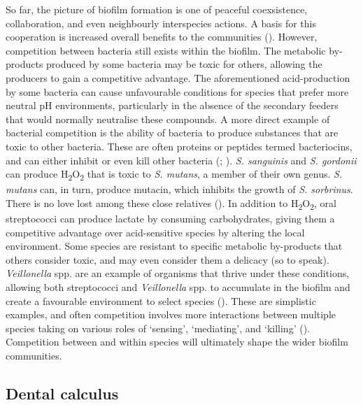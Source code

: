 \documentclass[
  b5paper,
]{book}
\begin{document}
So far, the picture of biofilm formation is one of peaceful
coexsistence, collaboration, and even neighbourly interspecies actions.
A basis for this cooperation is increased overall benefits to the
communities (). However, competition between bacteria still exists
within the biofilm. The metabolic by-products produced by some bacteria
may be toxic for others, allowing the producers to gain a competitive
advantage. The aforementioned acid-production by some bacteria can cause
unfavourable conditions for species that prefer more neutral pH
environments, particularly in the absence of the secondary feeders that
would normally neutralise these compounds. A more direct example of
bacterial competition is the ability of bacteria to produce substances
that are toxic to other bacteria. These are often proteins or peptides
termed bacteriocins, and can either inhibit or even kill other bacteria
(;
).
\emph{S. sanguinis} and \emph{S. gordonii} can produce
H\textsubscript{2}O\textsubscript{2} that is toxic to \emph{S. mutans},
a member of their own genus. \emph{S. mutans} can, in turn, produce
mutacin, which inhibits the growth of \emph{S. sorbrinus}. There is no
love lost among these close relatives
(). In addition
to H\textsubscript{2}O\textsubscript{2}, oral streptococci can produce
lactate by consuming carbohydrates, giving them a competitive advantage
over acid-sensitive species by altering the local environment. Some
species are resistant to specific metabolic by-products that others
consider toxic, and may even consider them a delicacy (so to speak).
\emph{Veillonella} spp. are an example of organisms that thrive under
these conditions, allowing both streptococci and \emph{Veillonella} spp.
to accumulate in the biofilm and create a favourable environment to
select species (). These are simplistic examples, and often competition
involves more interactions between multiple species taking on various
roles of `sensing', `mediating', and `killing'
(). Competition between and within species will ultimately shape the
wider biofilm communities.

\subsection{Dental calculus}\label{dental-calculus}
\end{document}

